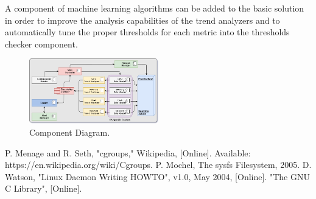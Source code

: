 \documentclass[conference]{IEEEtran}
\begin{document}
A component of machine learning algorithms can be added to the basic solution in order to improve the analysis capabilities of the trend analyzers and to automatically tune the proper thresholds for each metric into the thresholds checker component.

\begin{figure}[	!htbp]
\centerline{\includegraphics[width=0.5\textwidth]{./img/ComponentDiagram.png}}
\caption{Component Diagram.\label{componentDiagram}}
\end{figure}

\begin{thebibliography}{00}
 P. Menage and R. Seth, "cgroups," Wikipedia, [Online]. Available: https://en.wikipedia.org/wiki/Cgroups.
 P. Mochel, The sysfs Filesystem, 2005.
 D. Watson, "Linux Daemon Writing HOWTO", v1.0, May 2004, [Online].
 "The GNU C Library", [Online].
\end{thebibliography}
\end{document}
